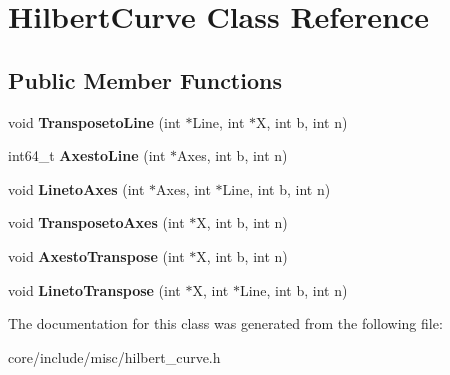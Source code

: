 \hypertarget{classHilbertCurve}{}\section{Hilbert\+Curve Class Reference}
\label{classHilbertCurve}
\subsection*{Public Member Functions}
\begin{DoxyCompactItemize}
\item 
\hypertarget{classHilbertCurve_a7a593c4fc4a33260f09527bbc306da1a}{}void {\bfseries Transposeto\+Line} (int $\ast$Line, int $\ast$X, int b, int n)\label{classHilbertCurve_a7a593c4fc4a33260f09527bbc306da1a}

\item 
\hypertarget{classHilbertCurve_a384d5fce36b7723c9db075db5f49292b}{}int64\+\_\+t {\bfseries Axesto\+Line} (int $\ast$Axes, int b, int n)\label{classHilbertCurve_a384d5fce36b7723c9db075db5f49292b}

\item 
\hypertarget{classHilbertCurve_aae2d31928252cd54923f99fb34590233}{}void {\bfseries Lineto\+Axes} (int $\ast$Axes, int $\ast$Line, int b, int n)\label{classHilbertCurve_aae2d31928252cd54923f99fb34590233}

\item 
\hypertarget{classHilbertCurve_a830a6dd4c04383b13df852ec0cfa6113}{}void {\bfseries Transposeto\+Axes} (int $\ast$X, int b, int n)\label{classHilbertCurve_a830a6dd4c04383b13df852ec0cfa6113}

\item 
\hypertarget{classHilbertCurve_a5a0650c69dd8fda4e7d5596ae5bc8f5b}{}void {\bfseries Axesto\+Transpose} (int $\ast$X, int b, int n)\label{classHilbertCurve_a5a0650c69dd8fda4e7d5596ae5bc8f5b}

\item 
\hypertarget{classHilbertCurve_a10e64deb1f187a2a60a86e093172ce76}{}void {\bfseries Lineto\+Transpose} (int $\ast$X, int $\ast$Line, int b, int n)\label{classHilbertCurve_a10e64deb1f187a2a60a86e093172ce76}

\end{DoxyCompactItemize}


The documentation for this class was generated from the following file\+:\begin{DoxyCompactItemize}
\item 
core/include/misc/hilbert\+\_\+curve.\+h\end{DoxyCompactItemize}
